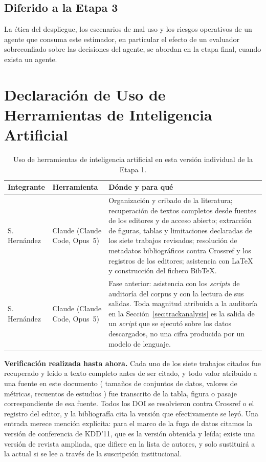 \documentclass[conference]{IEEEtran}
\begin{document}
\subsection{Diferido a la Etapa 3}
La \'etica del despliegue, los escenarios de mal uso y los riesgos
operativos de un agente que consuma este estimador, en particular el
efecto de un evaluador sobreconfiado sobre las decisiones del agente, se
abordan en la etapa final, cuando exista un agente.

\section{Declaraci\'on de Uso de Herramientas de Inteligencia Artificial}
\label{sec:aideclaration}

\begin{table}[!t]
\centering
\caption{Uso de herramientas de inteligencia artificial en esta versi\'on
individual de la Etapa 1.}
\label{tab:aiusage}
\footnotesize
\begin{tabularx}{\columnwidth}{@{}P{1.5cm} P{1.5cm} Y@{}}
\toprule
\textbf{Integrante} & \textbf{Herramienta} & \textbf{D\'onde y para qu\'e}\\
\midrule
S. Hern\'andez &
Claude (Claude Code, Opus~5) &
Organizaci\'on y cribado de la literatura; recuperaci\'on de textos
completos desde fuentes de los editores y de acceso abierto; extracci\'on de
figuras, tablas y limitaciones declaradas de los siete trabajos revisados;
resoluci\'on de metadatos bibliogr\'aficos contra Crossref y los registros de
los editores; asistencia con LaTeX y construcci\'on del fichero BibTeX.\\
\addlinespace
S. Hern\'andez &
Claude (Claude Code, Opus~5) &
Fase anterior: asistencia con los \emph{scripts} de auditor\'ia del corpus y
con la lectura de sus salidas. Toda magnitud atribuida a la auditor\'ia en la
Secci\'on~\ref{sec:trackanalysis} es la salida de un \emph{script} que se
ejecut\'o sobre los datos descargados, no una cifra producida por un modelo
de lenguaje.\\
\bottomrule
\end{tabularx}
\end{table}

\noindent\textbf{Verificaci\'on realizada hasta ahora.} Cada uno de los
siete trabajos citados fue recuperado y le\'ido a texto completo antes de ser
citado, y todo valor atribuido a una fuente en este documento ( tama\~nos
de conjuntos de datos, valores de m\'etricas, recuentos de estudios ) fue
transcrito de la tabla, figura o pasaje correspondiente de esa fuente. Todos
los DOI se resolvieron contra Crossref o el registro del editor, y la
bibliograf\'ia cita la versi\'on que efectivamente se ley\'o. Una entrada
merece menci\'on expl\'icita: para el marco de la fuga de datos citamos la
versi\'on de conferencia de KDD'11, que es la versi\'on obtenida y le\'ida;
existe una versi\'on de revista ampliada, que difiere en la lista de autores,
y solo sustituir\'a a la actual si se lee a trav\'es de la suscripci\'on
institucional.
\end{document}
